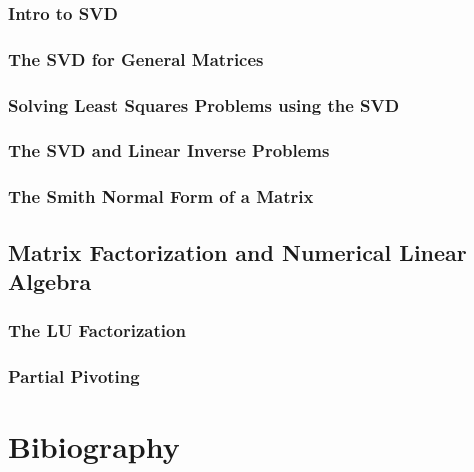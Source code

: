 \documentclass{book}
\theoremstyle{definition}
\theoremstyle{remark}
\begin{document}
\subsection{Intro to SVD}
\subsection{The SVD for General Matrices}
\subsection{Solving Least Squares Problems using the SVD}
\subsection{The SVD and Linear Inverse Problems}
\subsection{The Smith Normal Form of a Matrix}

\newpage
\section{Matrix Factorization and Numerical Linear Algebra}
\subsection{The LU Factorization}
\subsection{Partial Pivoting}





\newpage
\chapter{Bibiography}
\printbibliography
\end{document}

